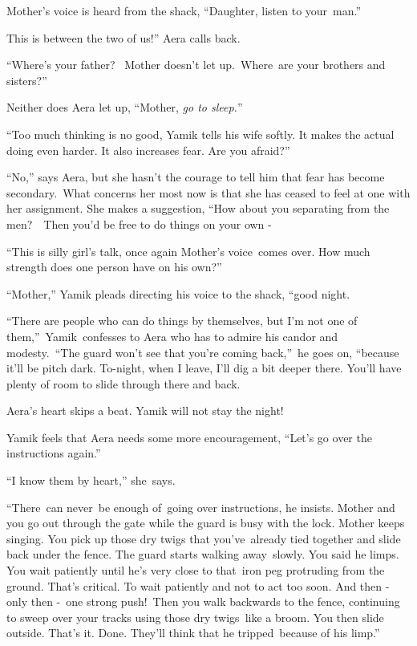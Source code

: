 \documentclass[letterpaper]{article}
\begin{document}
Mother's voice is heard from the shack, ``Daughter, listen to your~man.'' 

{\textquotedbl}This is between the two of us!'' Aera calls back.

{}``Where's your father?{\textquotedbl} ~Mother doesn't let up.\ {\textquotedbl}Where\textcolor{red}{\ }are your
brothers and sisters?'' 

Neither does Aera let up, ``Mother, \textit{go to sleep.}{}'' 

{}``Too much thinking is no good,{\textquotedbl} Yamik tells his wife softly. {\textquotedbl}It makes the actual doing
even harder. It also increases fear. Are you afraid?'' 

{}``No,'' says Aera, but she hasn't the courage to tell him that fear has become secondary.\ What concerns her most now
is that she has ceased to feel at one with her assignment. She makes a suggestion, ``How about you separating from the
men?\ \ Then you'd be free to do things on your own -{\textquotedbl}\ 

{}``This is silly girl's talk,{\textquotedbl} once again Mother's voice\ comes over. {\textquotedbl}How much strength
does one person have on his own?'' 

{}``Mother,'' Yamik pleads directing his voice to the shack, ``good night.{\textquotedbl} 

{}``There are people who can do things by themselves, but I'm not one of
them,{}''\ Yamik\textcolor[rgb]{0.0,0.4392157,0.7529412}{\ }confesses to Aera who has to admire his candor and
modesty.\ {}``The guard won't see that you're coming back,{}''\ he goes on, ``because it'll be pitch dark. To-night,
when I leave, I'll dig a bit deeper there. You'll have plenty of room to slide through there and back.{\textquotedbl} 

Aera's heart skips a beat. Yamik will not stay the night! 

Yamik feels that Aera needs some more encouragement, ``Let's go over the instructions again.'' 

{}``I know them by heart,'' she\ says. 

{}``There~can never~be enough of~going over instructions,{\textquotedbl} he insists. {\textquotedbl}Mother and you go
out through the gate while the guard is busy with the lock. Mother keeps singing. You pick up those dry twigs that
you've~already tied together and slide back under the fence. The guard starts walking away\ slowly. You said he limps.
You wait patiently until he's very close to that~iron peg protruding from the ground. That's critical. To wait
patiently and not to act too soon. And then -  only then -\ one strong push!\ Then you walk backwards to the fence,
continuing to sweep over your tracks using those dry twigs\textcolor[rgb]{0.0,0.4392157,0.7529412}{\ }like a broom. You
then slide outside. That's it. Done. They'll think that he tripped\textcolor[rgb]{0.0,0.4392157,0.7529412}{\ }because
of his limp.'' 
\end{document}
